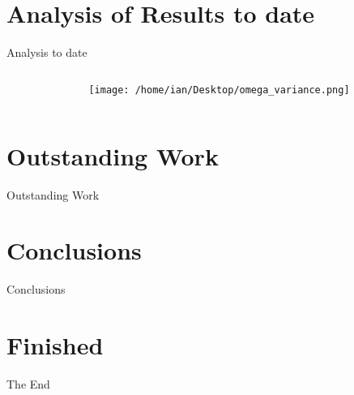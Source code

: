 \documentclass[10pt,mathserif]{beamer}
\begin{document}
\section{Analysis of Results to date}

\begin{frame}{Analysis to date}
\begin{columns}[t]						%
\begin{column}{0.60\linewidth}
\begin{itemize}
\end{itemize}

\end{column}
\begin{column}{0.40\linewidth}
\begin{figure}
\begin{center}
\texttt{[image: /home/ian/Desktop/omega\_variance.png]}
\end{center}
\end{figure}
\end{column}
\end{columns}
\end{frame}


\section{Outstanding Work}
\begin{frame}{Outstanding Work}
\begin{itemize}
\end{itemize}

\end{frame}

\section{Conclusions}
\begin{frame}{Conclusions}
\end{frame}

\section{Finished}
\begin{frame}{The End}
\end{frame}
\end{document}
